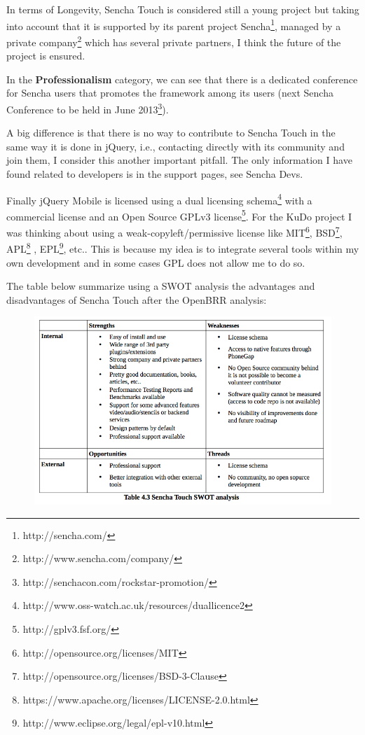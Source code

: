 \documentclass[a4paper,12pt]{book}
\begin{document}
In terms of Longevity, Sencha Touch is considered still a young project but taking into account that it is supported by its parent project Sencha\footnote{http://sencha.com/}, managed by a private company\footnote{http://www.sencha.com/company/}  which has several private partners, I think the future of the project is ensured.

In the \textbf{Professionalism} category, we can see that there is a dedicated conference for Sencha users\cite{sencha Conferences} that promotes the framework among its users  (next Sencha Conference to be held in June 2013\footnote{http://senchacon.com/rockstar-promotion/}).

A big difference is that there is no way to contribute to Sencha Touch in the same way it is done in jQuery, i.e., contacting directly with its community and join them, I consider this another important pitfall. The only information I have found related to developers is in the support pages, see Sencha Devs\cite{sencha Devs}.  

Finally jQuery Mobile is licensed using a dual licensing schema\footnote{http://www.oss-watch.ac.uk/resources/duallicence2}  with a commercial license and an Open Source GPLv3 license\footnote{http://gplv3.fsf.org/}. For the KuDo project I was thinking about using a weak-copyleft/permissive license like MIT\footnote{http://opensource.org/licenses/MIT}, BSD\footnote{http://opensource.org/licenses/BSD-3-Clause}, APL\footnote{https://www.apache.org/licenses/LICENSE-2.0.html} , EPL\footnote{http://www.eclipse.org/legal/epl-v10.html}, etc.. This is because my idea is to integrate several tools within my own development and in some cases GPL does not allow me to do so. 

The table below summarize using a SWOT analysis the advantages and disadvantages of Sencha Touch after the OpenBRR analysis:

\begin{figure}[H]
    \centering
    \includegraphics[width=12cm, keepaspectratio]{img/table43.png}
 \end{figure}
\end{document}
